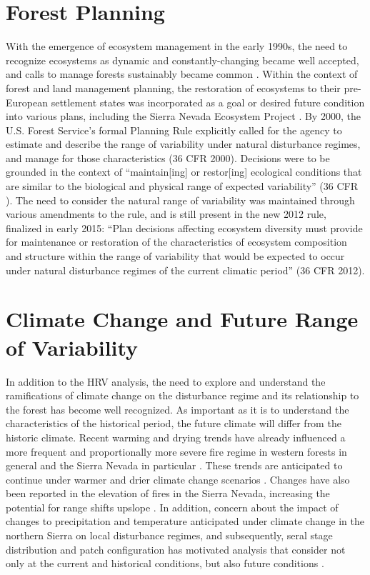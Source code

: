 \section{Forest Planning}

With the emergence of ecosystem management in the early 1990s, the need to recognize ecosystems as dynamic and constantly-changing became well accepted, and calls to manage forests sustainably became common \citep{Christensen1996}. Within the context of forest and land management planning, the restoration of ecosystems to their pre-European settlement states was incorporated as a goal or desired future condition into various plans, including the Sierra Nevada Ecosystem Project \cite{SNEP1996a}. By 2000, the U.S. Forest Service's formal Planning Rule explicitly called for the agency to estimate and describe the range of variability under natural disturbance regimes, and manage for those characteristics (36 CFR  2000). Decisions were to be grounded in the context of ``maintain[ing] or restor[ing] ecological conditions that are similar to the biological and physical range of expected variability'' (36 CFR ). The need to consider the natural range of variability was maintained through various amendments to the rule, and is still present in the new 2012 rule, finalized in early 2015: ``Plan decisions affecting ecosystem diversity must provide for maintenance or restoration of the characteristics of ecosystem composition and structure within the range of variability that would be expected to occur under natural disturbance regimes of the current climatic period'' (36 CFR  2012). 



\section{Climate Change and Future Range of Variability}

In addition to the HRV analysis, the need to explore and understand the ramifications of climate change on the disturbance regime and its relationship to the forest has become well recognized. As important as it is to understand the characteristics of the historical period, the future climate will differ from the historic climate. 
%
Recent warming and drying trends have already influenced a more frequent and proportionally more severe fire regime in western forests in general and the Sierra Nevada in particular \citep{McKenzie2004,Westerling2011,Miller2012}. These trends are anticipated to continue under warmer and drier climate change scenarios \citep{Westerling2008}. Changes have also been reported in the elevation of fires in the Sierra Nevada, increasing the potential for range shifts upslope \citep{Schwartz2015}. In addition, concern about the impact of changes to precipitation and temperature anticipated under climate change in the northern Sierra on local disturbance regimes, and subsequently, seral stage distribution and patch configuration has motivated analysis that consider not only at the current and historical conditions, but also future conditions \citep{Fule2008,North2012}.

